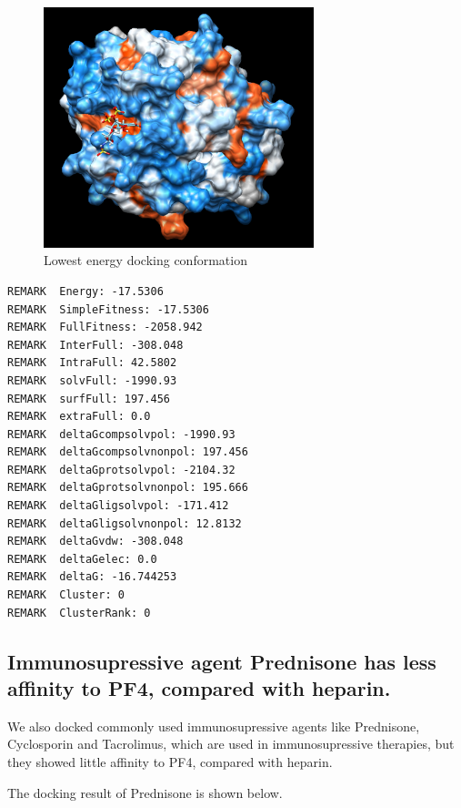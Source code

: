 \begin{figure}[H]
    \centering
    \includegraphics[width=0.7\textwidth]{image/DOCK.png}
    \caption{Lowest energy docking conformation}
    \label{HMCD3}
\end{figure}

\begin{lstlisting}
REMARK  Energy: -17.5306
REMARK  SimpleFitness: -17.5306
REMARK  FullFitness: -2058.942
REMARK  InterFull: -308.048
REMARK  IntraFull: 42.5802
REMARK  solvFull: -1990.93
REMARK  surfFull: 197.456
REMARK  extraFull: 0.0
REMARK  deltaGcompsolvpol: -1990.93
REMARK  deltaGcompsolvnonpol: 197.456
REMARK  deltaGprotsolvpol: -2104.32
REMARK  deltaGprotsolvnonpol: 195.666
REMARK  deltaGligsolvpol: -171.412
REMARK  deltaGligsolvnonpol: 12.8132
REMARK  deltaGvdw: -308.048
REMARK  deltaGelec: 0.0
REMARK  deltaG: -16.744253
REMARK  Cluster: 0
REMARK  ClusterRank: 0
\end{lstlisting}





\subsection{Immunosupressive agent Prednisone has less affinity to PF4, compared with heparin.}

We also docked commonly used immunosupressive agents like Prednisone, Cyclosporin and Tacrolimus, which are used in immunosupressive therapies, but they showed little affinity to PF4, compared with heparin.

The docking result of Prednisone is shown below.

